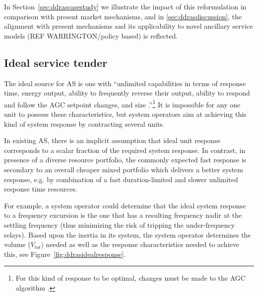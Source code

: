 In Section~\ref{sec:ddrascasestudy} we illustrate the impact of this reformulation in comparison with present market mechanisms, and in \ref{sec:ddrasdiscussion}, the alignment with present mechanisms and its applicability to novel ancillary service models (REF WARRINGTON/policy based) is reflected.  

\subsection{Ideal service tender}\label{subsec:idealtender}
The ideal source for AS is one with ``unlimited capabilities in terms of response time, energy output, ability to frequently reverse their output, ability to respond and follow the AGC setpoint changes, and size .''\cite{makarov2008assessing}\footnote{For this kind of response to be optimal, changes must be made to the AGC algorithm \cite{peydayesh2012effects}.} It is impossible for any one unit to possess these characteristics, but system operators aim at achieving this kind of system response by contracting several units.

In existing AS, there is an implicit assumption that ideal unit response corresponds to a scalar fraction of the required system response. In contrast, in presence of a diverse resource portfolio, the commonly expected fast response is secondary to an overall cheaper mixed portfolio which delivers a better system response, e.g. by combination of a fast duration-limited and slower unlimited response time resources.


For example, a system operator could determine that the ideal system response to a frequency excursion is the one that has a resulting frequency nadir at the settling frequency (thus minimizing the risk of tripping the under-frequency relays). Based upon the inertia in its system, the system operator determines the volume ($V_{tot})$ needed as well as the response characteristics needed to achieve this, see Figure~\ref{fig:ddrasidealresponse}.

